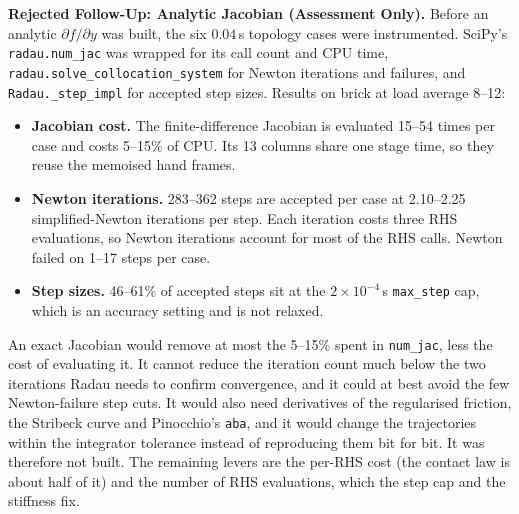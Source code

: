 \documentclass[11pt,a4paper]{article}
\begin{document}
\textbf{Rejected Follow-Up: Analytic Jacobian (Assessment Only).} Before an analytic $\partial f/\partial y$ was built,
the six $0.04$\,s topology cases were instrumented. SciPy's \texttt{radau.num\_jac} was wrapped for its call count and
CPU time, \texttt{radau.solve\_collocation\_system} for Newton iterations and failures, and \texttt{Radau.\_step\_impl}
for accepted step sizes. Results on brick at load average 8--12:
\begin{itemize}[leftmargin=*,noitemsep]
\item \textbf{Jacobian cost.} The finite-difference Jacobian is evaluated 15--54 times per case and costs 5--15\% of CPU.
  Its 13 columns share one stage time, so they reuse the memoised hand frames.
\item \textbf{Newton iterations.} 283--362 steps are accepted per case at 2.10--2.25 simplified-Newton iterations per
  step. Each iteration costs three RHS evaluations, so Newton iterations account for most of the RHS calls. Newton
  failed on 1--17 steps per case.
\item \textbf{Step sizes.} 46--61\% of accepted steps sit at the $2\times10^{-4}$\,s \texttt{max\_step} cap, which is an
  accuracy setting and is not relaxed.
\end{itemize}
An exact Jacobian would remove at most the 5--15\% spent in \texttt{num\_jac}, less the cost of evaluating it. It
cannot reduce the iteration count much below the two iterations Radau needs to confirm convergence, and it could at
best avoid the few Newton-failure step cuts. It would also need derivatives of the regularised friction, the Stribeck
curve and Pinocchio's \texttt{aba}, and it would change the trajectories within the integrator tolerance instead of
reproducing them bit for bit. It was therefore not built. The remaining levers are the per-RHS cost (the contact law
is about half of it) and the number of RHS evaluations, which the step cap and the stiffness fix.
\end{document}
